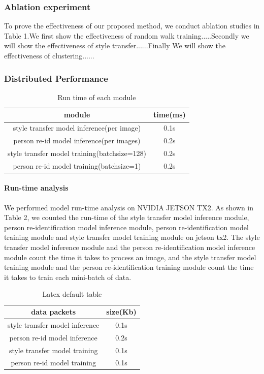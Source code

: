 \documentclass{article}
\begin{document}
\subsubsection{Ablation experiment}
To prove the effectiveness of our proposed method,  we conduct ablation studies in Table 1.We first show the effectiveness of random walk training.....Secondly we will show the effectiveness of style transfer......Finally We will show the effectiveness of clustering......


\subsubsection{Distributed Performance}


\begin{table}
\centering
\begin{tabular}{c|c}
\hline
module  & time(ms) \\
\hline
style transfer model inference(per image)   & 0.1s  \\
person re-id model inference(per images)     & 0.2s  \\
style transfer model training(batchsize=128)    & 0.2s  \\
person re-id model training(batchsize=1)      & 0.2s  \\
\hline
\end{tabular}
\caption{Run time of each module}
\label{tab:plain}
\end{table}


\paragraph{Run-time analysis}
We performed model run-time analysis on NVIDIA JETSON TX2. As shown in Table 2, we counted the run-time of the style transfer model inference module, person re-identification model inference module, person re-identification model training module and style transfer model training module  on jetson tx2. The style transfer model inference module and the person re-identification model inference module count the time it takes to process an image, and the style transfer model training module and the person re-identification training module count the time it takes to train each mini-batch of data.


\begin{table}
\centering
\begin{tabular}{c|c}
\hline
data packets  & size(Kb) \\
\hline
style transfer model inference   & 0.1s  \\
person re-id model inference     & 0.2s  \\
style transfer model training    & 0.1s  \\
person re-id model training      & 0.1s  \\
\hline
\end{tabular}
\caption{Latex default table}
\label{tab:plain}
\end{table}
\end{document}
